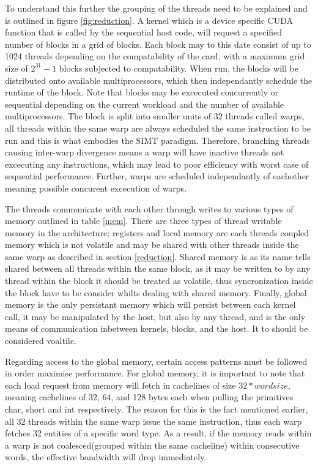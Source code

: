 \documentclass{aamas2012}
\begin{document}
To understand this further the grouping of the threads need to be explained and is outlined in figure \ref{fig:reduction}.
A kernel which is a device specific CUDA function that is called by the sequential host code,
will request a specified number of blocks in a grid of blocks.
Each block may to this date consist of up to 1024 threads depending on the compatability of the card, with a maximum
grid size of $2^{31}-1$ blocks subjected to compatability. When run, the blocks will be distributed onto available multiprocessors,
which then independantly schedule the runtime of the block. Note that blocks may be excecuted concurrently or sequential depending on
the current workload and the number of available multiprocessors.
The block is split into smaller units of 32 threads called warps, all threads within the same warp are always scheduled
the same instruction to be run and this is what embodies the SIMT paradigm. 
Therefore, branching threads causing inter-warp divergence means a warp will have inactive threads not excecuting any instructions, 
which may lead to poor efficiency with worst case of sequential performance. Further, warps are scheduled independantly of eachother
meaning possible concurent excecution of warps.

The threads communicate with each other through writes to various types of memory outlined in table \ref{mem}.
There are three types of thread writable memory in the architecture; registers and local memory are each threads
coupled memory which is not volatile and may be shared with other threads inside the same warp as described in section \ref{reduction}. 
Shared memory is as its name tells shared between all threads within the same block, as it may be written to by any thread within the block
it should be treated as volatile, thus syncronization inside the block have to be consider whilts dealing with shared memory.
Finally, global memory is the only persistant memory which will persist between each kernel call, it may be manipulated by the host,
but also by any thread, and is the only means of communication inbetween kernels, blocks, and the host. It to should be considered voaltile.

Regarding access to the global memory, certain access patterns must be followed in order maximise performance. 
For global memory, it is important to note that each load request from memory will fetch in cachelines of size $32*wordsize$,
meaning cachelines of 32, 64, and 128 bytes each when pulling the primitives char, short and int respectively.
The reason for this is the fact mentioned earlier, all 32 threads within the same warp issue the same instruction, 
thus each warp fetches 32 entities of a specific word type.
As a result, if the memory reads within a warp is not coalesced(grouped within the same cacheline) within consecutive words, the effective bandwidth will drop immediately.
\end{document}
